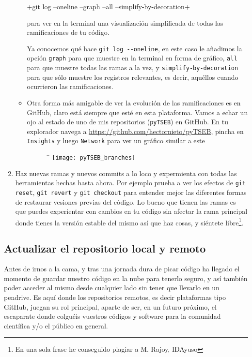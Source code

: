 \documentclass[a5paper,10pt]{article}
\begin{document}
\begin{enumerate}
\begin{itemize}
     \hspace{-2cm}\cverb+git log --oneline --graph --all --simplify-by-decoration+
     
     para ver en la terminal una visualización simplificada de todas las ramificaciones de tu código. 
     
     Ya conocemos qué hace \verb+git log --oneline+, en este caso le añadimos la opción \verb+graph+ para que muestre en la terminal en forma de gráfico, \verb+all+ para que muestre todas las ramas a la vez, y  \verb+simplify-by-decoration+ para que sólo muestre los registros relevantes, es decir, aquéllos cuando ocurrieron las ramificaciones.
     
     \item Otra forma más amigable de ver la evolución de las ramificaciones es en GitHub, claro está siempre que esté en esta plataforma. Vamos a echar un ojo al estado de uno de mis repositorios (\verb+pyTSEB+) en GitHub. 
     En tu explorador navega a \url{https://github.com/hectornieto/pyTSEB}, pincha en \verb+Insights+ y luego \verb+Network+ para ver un gráfico similar a este
     \begin{figure}[H]¯
      \hspace{-1cm}\texttt{[image: pyTSEB\_branches]}
     \end{figure}
    \end{itemize}

    \item Haz nuevas ramas y nuevos commits a lo loco y expermienta con todas las herramientas hechas hasta ahora. Por ejemplo prueba a ver los efectos de \verb+git reset+, \verb+git revert+ y \verb+git checkout+ para entender mejor las diferentes formas de restaurar vesiones previas del código. Lo bueno que tienen las ramas es que puedes experientar con cambios en tu código sin afectar la rama principal donde tienes la versión estable del mismo así que haz cosas, y siéntete libre\footnote{En una sola frase he conseguido plagiar a M. Rajoy, IDAyuso}.
    \end{enumerate}
 
   \subsection{Actualizar el repositorio  local y remoto}
    Antes de irnos a la cama, y tras una jornada dura de picar código ha llegado el momento de guardar nuestro código en la nube para tenerlo seguro, y así también poder acceder al mismo desde cualquier lado sin tener que llevarlo en un pendrive. Es aquí donde los repositorios remotos, es decir plataformas tipo GitHub, juegan su rol principal, aparte de ser, en un futuro próximo, el escaparate donde colguéis vuestros códigos y software para la comunidad científica y/o el público en general.
    
\end{document}
